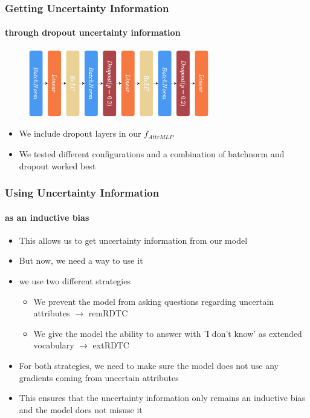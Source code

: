 \documentclass[9pt]{beamer}
\begin{document}
\begin{frame}
\frametitle{Getting Uncertainty Information}
\framesubtitle{through dropout uncertainty information}
\begin{figure}
	\centering
	\includegraphics[width=0.7\textwidth]{images/f_attrMLP.pdf}
\end{figure}
\begin{itemize}
	\item We include dropout layers in our $f_{AttrMLP}$
	\item We tested different configurations and a combination of batchnorm and dropout worked best
\end{itemize}
\end{frame}



\begin{frame}	
\frametitle{Using Uncertainty Information}
\framesubtitle{as an inductive bias}
\begin{itemize}
	\item This allows us to get uncertainty information from our model
	\item But now, we need a way to use it
	\item we use two different strategies
	\begin{itemize}
		\item We prevent the model from asking questions regarding uncertain attributes $\rightarrow$ remRDTC
		\item We give the model the ability to answer with 'I don't know' as extended vocabulary $\rightarrow$ extRDTC
	\end{itemize}
	\item For both strategies, we need to make sure the model does not use any gradients coming from uncertain attributes
	\item This ensures that the uncertainty information only remains an inductive bias and the model does not misuse it
\end{itemize}
\end{frame}
\end{document}
